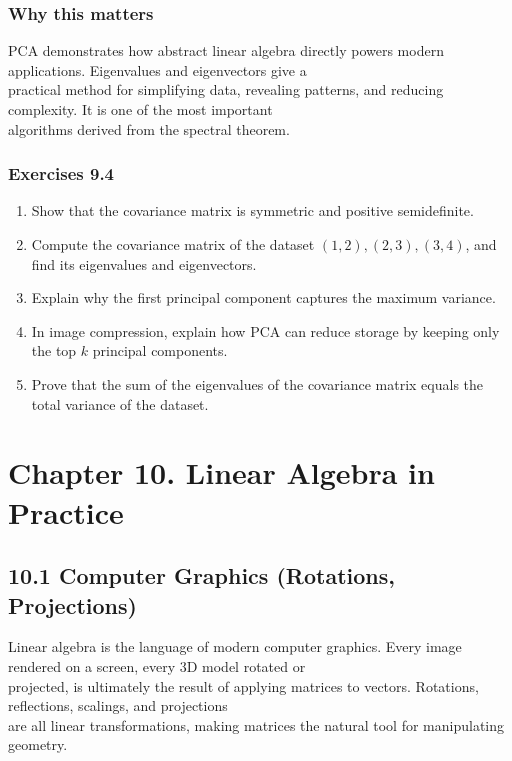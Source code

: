 \documentclass[
  12pt,
  a4paper,
]{article}
\let\oldsection\section
\renewcommand{\section}{\clearpage\oldsection}
\begin{document}
\subsubsection{Why this matters}\label{why-this-matters-35}

PCA demonstrates how abstract linear algebra directly powers modern
applications. Eigenvalues and eigenvectors give a\\
practical method for simplifying data, revealing patterns, and reducing
complexity. It is one of the most important\\
algorithms derived from the spectral theorem.

\subsubsection{Exercises 9.4}\label{exercises-94}

\begin{enumerate}
\def\labelenumi{\arabic{enumi}.}
\item
  Show that the covariance matrix is symmetric and positive
  semidefinite.
\item
  Compute the covariance matrix of the dataset \((1,2), (2,3), (3,4)\),
  and find its eigenvalues and eigenvectors.
\item
  Explain why the first principal component captures the maximum
  variance.
\item
  In image compression, explain how PCA can reduce storage by keeping
  only the top \(k\) principal components.
\item
  Prove that the sum of the eigenvalues of the covariance matrix equals
  the total variance of the dataset.
\end{enumerate}

\section{Chapter 10. Linear Algebra in
Practice}\label{chapter-10-linear-algebra-in-practice}

\subsection{10.1 Computer Graphics (Rotations,
Projections)}\label{101-computer-graphics-rotations-projections}

Linear algebra is the language of modern computer graphics. Every image
rendered on a screen, every 3D model rotated or\\
projected, is ultimately the result of applying matrices to vectors.
Rotations, reflections, scalings, and projections\\
are all linear transformations, making matrices the natural tool for
manipulating geometry.
\end{document}
